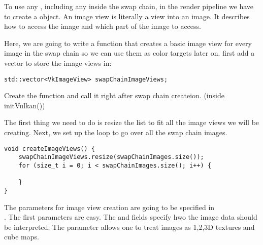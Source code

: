 \par To use any , including any inside the swap chain, in the render pipeline we have to create a  object. An image view is literally a view into an image. It describes how to access the image and which part of the image to access. 

\par Here, we are going to write a  function that creates a basic image view for every image in the swap chain so we can use them as color targets later on. first add a vector to store the image views in:

\begin{center}
\begin{minipage}{0.95\linewidth}
\begin{lstlisting}
std::vector<VkImageView> swapChainImageViews; 
\end{lstlisting}
\end{minipage}
\end{center}

\par Create the  function and call it right after swap chain createion. (inside initVulkan())

\par The first thing we need to do is resize the list to fit all the image views we will be creating. Next, we set up the loop to go over all the swap chain images.

\begin{center}
\begin{minipage}{0.95\linewidth}
\begin{lstlisting}
void createImageViews() {
    swapChainImageViews.resize(swapChainImages.size());
    for (size_t i = 0; i < swapChainImages.size(); i++) {

    }
}
\end{lstlisting}
\end{minipage}
\end{center}

\par The parameters for image view creation are going to be specified in \\ . The first parameters are easy. The  and  fields specify hwo the image data should be interpreted. The  parameter allows one to treat images as 1,2,3D textures and cube maps.

